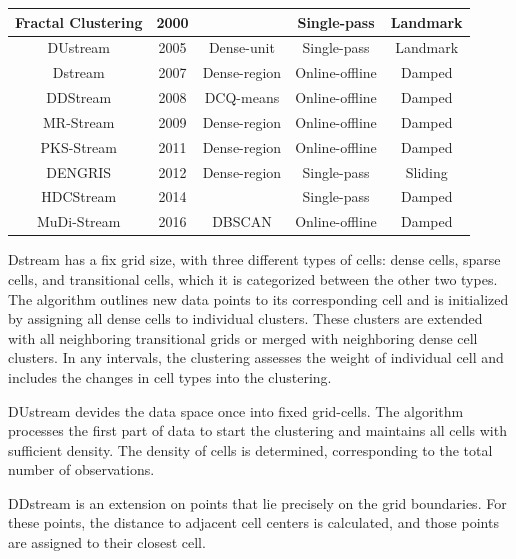 \documentclass[../UNBThesis2.tex]{subfiles}
\begin{document}
\begin{itemize}
\begin{table}[h]
\begin{tabular}{c c c c c}
      Fractal Clustering &    2000        &           &  Single-pass        & Landmark\\
          \hline 
     DUstream            &    2005        &      Dense-unit       &     Single-pass     &  Landmark\\
      \hline
      Dstream            &     2007       &    Dense-region       &  Online-offline     &   Damped\\
    \hline 
      DDStream           &    2008        &    DCQ-means          &     Online-offline  & Damped \\
    \hline 
      MR-Stream          &    2009        &     Dense-region      &  Online-offline     & Damped\\
    \hline 
      PKS-Stream         &    2011        &    Dense-region       &  Online-offline     & Damped\\
          \hline 
      DENGRIS            &    2012        &   Dense-region        &  Single-pass        & Sliding\\
          \hline 
      HDCStream            &    2014        &           &    Single-pass      & Damped\\
          \hline 
      MuDi-Stream        &    2016        &       DBSCAN          & Online-offline      & Damped\\
\bottomrule
    \end{tabular}
\end{table}

Dstream has a fix grid size, with three different types of cells: dense cells, sparse cells, and transitional cells, which it is categorized between the other two types. The algorithm outlines new data points to its corresponding cell and is initialized by assigning all dense cells to individual clusters. These clusters are extended with all neighboring transitional grids or merged with neighboring dense cell clusters. In any intervals, the clustering assesses the weight of individual cell and includes the
changes in cell types into the clustering.


DUstream \cite{gao2005incremental} devides the data space once into fixed grid-cells.
The algorithm processes the first part of data to start the clustering and maintains all cells with sufficient density. The density of cells is determined, corresponding to the total number of observations. 

DDstream \cite{jia2008grid} is an extension on points that lie precisely on the grid boundaries. For these points, the distance to adjacent cell centers is calculated, and those points are assigned to their closest cell. 






\end{itemize}
\end{document}
